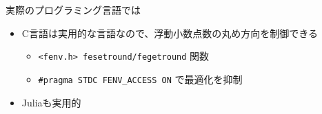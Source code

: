 \documentclass[aspectratio=169]{beamer}
\begin{document}

\begin{frame}{実際のプログラミング言語では}
  \begin{itemize}
  \item C言語は実用的な言語なので、浮動小数点数の丸め方向を制御できる
    \begin{itemize}
    \item \texttt{<fenv.h> fesetround/fegetround} 関数
    \item \texttt{\#pragma STDC FENV\_ACCESS ON} で最適化を抑制
    \end{itemize}
  \item Juliaも実用的
  \end{itemize}
\end{frame}
\end{document}
